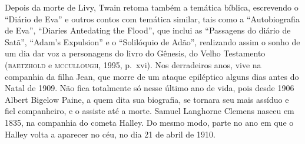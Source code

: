 Depois da morte de Livy, Twain retoma também a temática bíblica, escrevendo o
``Diário de Eva'' e outros contos com temática similar, tais como a
“Autobiografia de Eva”, “Diaries Antedating the Flood”, que inclui as
“Passagens do diário de Satã”, “Adam’s Expulsion” e o “Solilóquio de Adão”,
realizando assim o sonho de um dia dar voz a personagens do
livro do Gênesis, do Velho Testamento (\textsc{baetzhold} e \textsc{mccullough}, 1995, p.~xvi).
Nos derradeiros anos, vive na companhia da filha Jean, que morre de um ataque
epiléptico alguns dias antes do Natal de 1909. Não fica totalmente só
nesse último ano de vida, pois desde 1906 Albert Bigelow Paine, a quem
dita sua biografia, se tornara seu mais assíduo e fiel companheiro, e o
assiste até a morte. Samuel Langhorne Clemens nasceu em 1835, na companhia
do cometa Halley. Do mesmo modo, parte no ano em que o Halley volta a
aparecer no céu, no dia 21 de abril de 1910.


